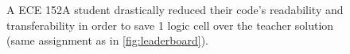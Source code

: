 
\begin{figure}[t]
    \centering
    \inputminted[frame=single]{SystemVerilog}{media/code/unreadable_opt.svh}
    \caption[
        Code optimized at expense of readability
    ]{
        A ECE 152A student drastically reduced their code's readability and transferability in order to save 1 logic cell over the teacher solution (same assignment as in \autoref{fig:leaderboard}).
    }
    \label{fig:unreadable_opt}
\end{figure}
